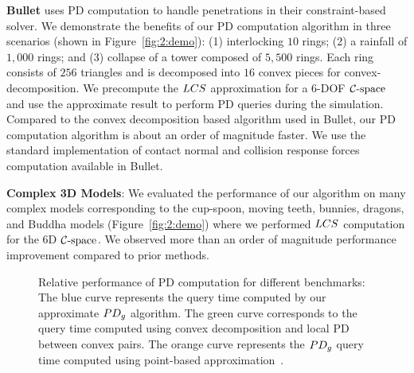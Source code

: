 \textbf{Bullet} uses PD computation to handle penetrations in their constraint-based solver.
We demonstrate the benefits of our PD computation algorithm in three scenarios (shown in Figure~\ref{fig:2:demo}):
(1) interlocking $10$ rings; (2) a rainfall of $1,000$ rings; and (3) collapse of a tower composed of $5,500$ rings.
Each ring consists of $256$ triangles and is decomposed into $16$ convex pieces for convex-decomposition.
We precompute the $LCS$ approximation for a 6-DOF $\mathcal C\text{-space}$ and use the approximate result to perform PD queries during the simulation.
Compared to the convex decomposition based algorithm used in Bullet, our PD computation algorithm is about
an order of magnitude faster. We use the standard implementation of contact normal and collision response forces computation available in Bullet.

\textbf{Complex 3D Models}:
We evaluated the performance of our algorithm on many complex models corresponding to the cup-spoon, moving teeth, bunnies, dragons, and Buddha models (Figure~\ref{fig:2:demo}) where we performed $LCS$ computation for the 6D $\mathcal C\text{-space}$. We observed more than an order of magnitude performance improvement compared to prior methods.


\begin{figure}[!h]
  \centering
    \hspace{0.05em}
  \caption[Relative performance of PD computation for different benchmarks]{Relative performance of PD computation for different benchmarks: The blue curve represents the query time computed by our approximate $PD_g$ algorithm. The green curve corresponds to the query time computed using convex decomposition and local PD between convex pairs. The orange curve represents the $PD_g$ query time computed using point-based approximation~\protect\cite{Lien:2009:ASM}.}\label{fig:2:performancecomparison}
\end{figure}





